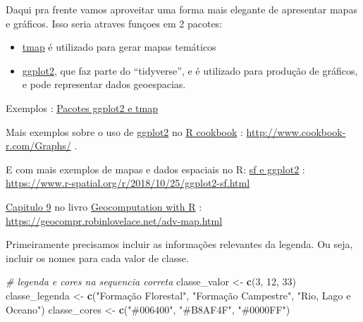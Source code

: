 \documentclass[
]{article}
\newenvironment{Shaded}{\begin{snugshade}}{\end{snugshade}}
\newcommand{\CommentTok}[1]{\textcolor[rgb]{0.56,0.35,0.01}{\textit{#1}}}
\newcommand{\DecValTok}[1]{\textcolor[rgb]{0.00,0.00,0.81}{#1}}
\newcommand{\FunctionTok}[1]{\textcolor[rgb]{0.13,0.29,0.53}{\textbf{#1}}}
\newcommand{\NormalTok}[1]{#1}
\newcommand{\OtherTok}[1]{\textcolor[rgb]{0.56,0.35,0.01}{#1}}
\newcommand{\StringTok}[1]{\textcolor[rgb]{0.31,0.60,0.02}{#1}}
\begin{document}
Daqui pra frente vamos aproveitar uma forma mais elegante de apresentar mapas e gráficos. Isso seria atraves funçoes em 2 pacotes:

\begin{itemize}
\item
  \href{https://cran.r-project.org/web/packages/tmap/vignettes/tmap-getstarted.html}{tmap} é utilizado para gerar mapas temáticos
\item
  \href{https://ggplot2.tidyverse.org/}{ggplot2}, que faz parte do ``tidyverse'', e é utilizado para produção de gráficos, e pode representar dados geoespacias.
\end{itemize}

Exemplos :
\href{https://www.youtube.com/watch?v=OYON-VzPFmw}{Pacotes ggplot2 e tmap}

Mais exemplos sobre o uso de \href{https://ggplot2.tidyverse.org/}{ggplot2} no \href{http://www.cookbook-r.com/Graphs/}{R cookbook} : \url{http://www.cookbook-r.com/Graphs/} .

E com mais exemplos de mapas e dados espaciais no R: \href{https://www.r-spatial.org/r/2018/10/25/ggplot2-sf.html}{sf e ggplot2} : \url{https://www.r-spatial.org/r/2018/10/25/ggplot2-sf.html}

\href{https://geocompr.robinlovelace.net/adv-map.html}{Capitulo 9} no livro \href{https://geocompr.robinlovelace.net/}{Geocomputation with R} : \url{https://geocompr.robinlovelace.net/adv-map.html}

Primeiramente precisamos incluir as informações relevantes da legenda. Ou seja, incluir os nomes para cada valor de classe.

\begin{Shaded}
\begin{Highlighting}[]
\CommentTok{\# legenda e cores na sequencia correta}
\NormalTok{classe\_valor }\OtherTok{\textless{}{-}} \FunctionTok{c}\NormalTok{(}\DecValTok{3}\NormalTok{, }\DecValTok{12}\NormalTok{, }\DecValTok{33}\NormalTok{)}
\NormalTok{classe\_legenda }\OtherTok{\textless{}{-}} \FunctionTok{c}\NormalTok{(}\StringTok{"Formação Florestal"}\NormalTok{, }
                   \StringTok{"Formação Campestre"}\NormalTok{, }\StringTok{"Rio, Lago e Oceano"}\NormalTok{)}
\NormalTok{classe\_cores }\OtherTok{\textless{}{-}} \FunctionTok{c}\NormalTok{(}\StringTok{"\#006400"}\NormalTok{, }\StringTok{"\#B8AF4F"}\NormalTok{, }\StringTok{"\#0000FF"}\NormalTok{) }
\end{Highlighting}
\end{Shaded}
\end{document}
